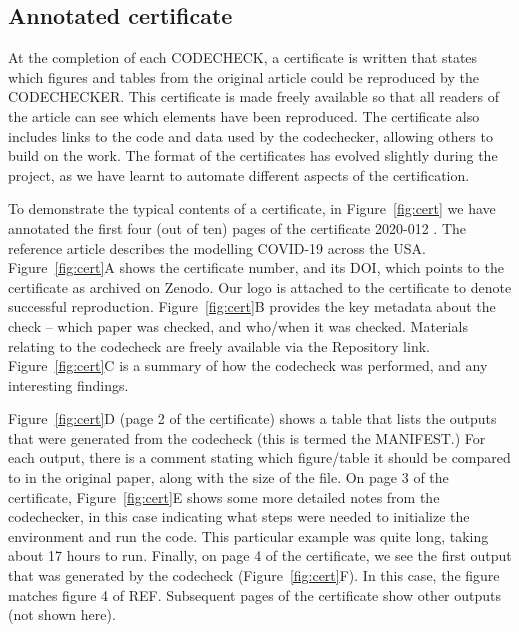 \documentclass[12pt]{article}
\begin{document}
\subsection*{Annotated certificate}\label{annotated-certificate}

At the completion of each CODECHECK, a certificate is written that
states which figures and tables from the original article could be
reproduced by the CODECHECKER.  This certificate is made freely
available so that all readers of the article can see which elements
have been reproduced.  The certificate also includes links to the code
and data used by the codechecker, allowing others to build on the
work.  The format of the certificates has evolved slightly during the
project, as we have learnt to automate different aspects of the
certification.  

To demonstrate the typical contents of a certificate, in
Figure~\ref{fig:cert} we have annotated the first four (out of ten)
pages of the certificate 2020-012 \cite{cert-2020-012}.  The reference
article \cite{Unwin2020} describes the modelling COVID-19 across the
USA.
Figure~\ref{fig:cert}A shows the certificate number, and its DOI,
which points to the certificate as archived on Zenodo.  Our logo is
attached to the certificate to denote successful reproduction.
Figure~\ref{fig:cert}B provides the key metadata about the check --
which paper was checked, and who/when it was checked.  Materials
relating to the codecheck are freely available via the Repository
link.  Figure~\ref{fig:cert}C is a summary of how the codecheck was
performed, and any interesting findings.

Figure~\ref{fig:cert}D (page 2 of the certificate) shows a table that
lists the outputs that were generated from the codecheck (this is
termed the MANIFEST.)  For each output, there is a comment stating
which figure/table it should be compared to in the original paper,
along with the size of the file.  On page 3 of the certificate,
Figure~\ref{fig:cert}E shows some more detailed notes from the
codechecker, in this case indicating what steps were needed to
initialize the environment and run the code.  This particular example
was quite long, taking about 17 hours to run.  Finally, on page 4 of
the certificate, we see the first output that was generated by the
codecheck (Figure~\ref{fig:cert}F).  In this case, the figure matches
figure 4 of REF.  Subsequent pages of the certificate show other
outputs (not shown here).
\end{document}
